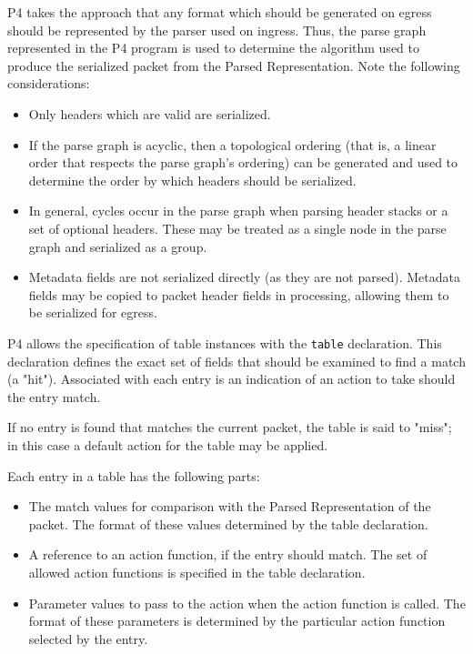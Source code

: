 \documentclass[12pt]{article}
\begin{document}
P4 takes the approach that any format which should be generated on egress 
should be represented by the parser used on ingress.  Thus, the parse graph 
represented in the P4 program is used to determine the algorithm used to produce 
the serialized packet from the Parsed Representation.  Note the following 
considerations:

\begin{itemize}
\item
Only headers which are valid are serialized.
\item
If the parse graph is acyclic, then a topological ordering (that is, a linear 
order that respects the parse graph's ordering) can be generated and used 
to determine the order by which headers should be serialized.
\item
In general, cycles occur in the parse graph when parsing header stacks or 
a set of optional headers.  These may be treated as a single node in the parse 
graph and serialized as a group. 
\item
Metadata fields are not serialized directly (as they are not parsed).  Metadata 
fields may be copied to packet header fields in \matchaction processing, allowing 
them to be serialized for egress.
\end{itemize}


P4 allows the specification of table instances with the \texttt{table}
declaration. This declaration defines the exact set of fields that
should be examined to find a match (a "hit").  Associated with each
entry is an indication of an action to take should the entry match.

If no entry is found that matches the current packet, the table is said to 
"miss"; in this case a default action for the table may be applied.

Each entry in a \matchaction table has the following parts: 

\begin{itemize}
\item
The match values for comparison with the Parsed Representation of the packet. 
The format of these values determined by the table declaration.
\item
A reference to an action function, if the entry should match. The set
of allowed action functions is specified in the table declaration.
\item
Parameter values to pass to the action when the action function is called. 
The format of these parameters is determined by the particular action function 
selected by the entry.
\end{itemize}
\end{document}
